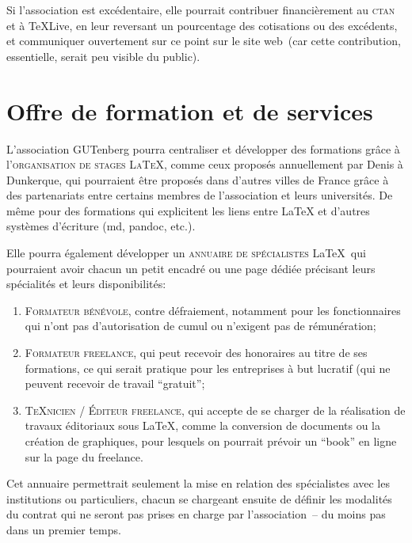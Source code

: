 \documentclass{tufte-handout}
\newcommand{\ratio}[3][]{\marginpar{\footnotesize{\textcolor{teal}{Temps requis: #2 / Utilité: #3}\par\noindent \textcolor{teal}{#1}}}}
\begin{document}
Si l'association est excédentaire\ratio[C'est encore un futur éloigné]{+}{+++}, elle pourrait contribuer financièrement au \textsc{ctan} et à \TeX Live, en leur reversant un pourcentage des cotisations ou des excédents, et communiquer ouvertement sur ce point sur le site web~(car cette contribution, essentielle, serait peu visible du public).


\section{Offre de formation et de services}

L'association GUTenberg\ratio[Chronophage, mais utile et potentiellement rémunéré]{+++}{+++} pourra centraliser et développer des formations grâce à l'\textsc{organisation de stages \LaTeX}, comme ceux proposés annuellement par Denis  à Dunkerque, qui pourraient être proposés dans d'autres villes de France grâce à des partenariats entre certains membres de l'association et leurs universités. De même pour des formations qui explicitent les liens entre \LaTeX{} et d'autres systèmes d'écriture (md, pandoc, etc.).

Elle pourra également\ratio[Gestion par les intéressés, autorisés par les administrateurs du site web]{+}{++} développer un \textsc{annuaire de spécialistes} \LaTeX\ qui pourraient avoir chacun un petit encadré ou une page dédiée précisant leurs spécialités et leurs disponibilités:
\begin{enumerate}
	\item\textsc{Formateur bénévole}, contre défraiement, notamment pour les fonctionnaires qui n'ont pas d'autorisation de cumul ou n'exigent pas de rémunération;
	\item\textsc{Formateur freelance}, qui peut recevoir des honoraires au titre de ses formations, ce qui serait pratique pour les entreprises à but lucratif (qui ne peuvent recevoir de travail \enquote{gratuit};
	\item\textsc{\TeX nicien / Éditeur freelance}, qui accepte de se charger de la réalisation de travaux éditoriaux sous \LaTeX, comme la conversion de documents ou la création de graphiques, pour lesquels on pourrait prévoir un \enquote{book} en ligne sur la page du freelance.
\end{enumerate}

Cet annuaire permettrait seulement la mise en relation des spécialistes avec les institutions ou particuliers, chacun se chargeant ensuite de définir les modalités du contrat qui ne seront pas prises en charge par l'association~-- du moins pas dans un premier temps.
\end{document}
